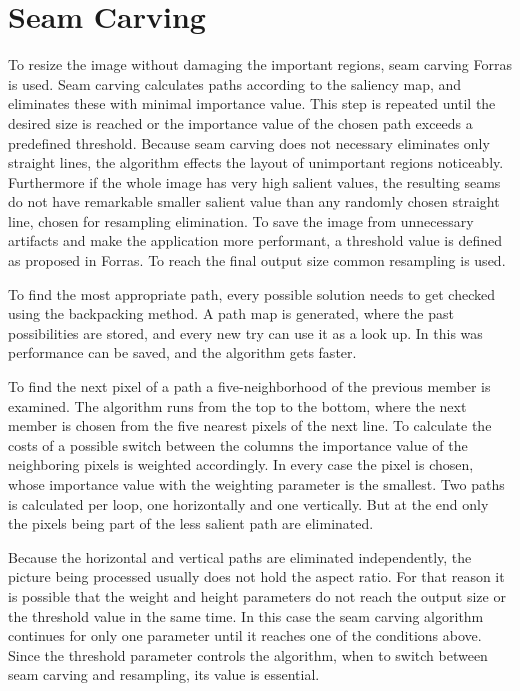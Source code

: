 \documentclass[draft,final]{vutinfth} %
\begin{document}
\section{Seam Carving}
To resize the image without damaging the important regions, seam carving Forras is used.
Seam carving calculates paths according to the saliency map, and eliminates these with minimal importance value.
This step is repeated until the desired size is reached or the importance value of the chosen path exceeds a predefined threshold.
Because seam carving does not necessary eliminates only straight lines, the algorithm effects the layout of unimportant regions noticeably.
Furthermore if the whole image has very high salient values, the resulting seams do not have remarkable smaller salient value than any randomly chosen straight line, chosen for resampling elimination.
To save the image from unnecessary artifacts and make the application more performant, a threshold value is defined as proposed in Forras.
To reach the final output size common resampling is used.\par 
To find the most appropriate path, every possible solution needs to get checked using the backpacking method.
A path map is generated, where the past possibilities are stored, and every new try can use it as a look up.
In this was performance can be saved, and the algorithm gets faster.\par 
To find the next pixel of a path a five-neighborhood of the previous member is examined.
The algorithm runs from the top to the bottom, where the next member is chosen from the five nearest pixels of the next line.
To calculate the costs of a possible switch between the columns the importance value of the neighboring pixels is weighted accordingly.
In every case the pixel is chosen, whose importance value with the weighting parameter is the smallest.
Two paths is calculated per loop, one horizontally and one vertically.
But at the end only the pixels being part of the less salient path are eliminated.\par 
Because the horizontal and vertical paths are eliminated independently, the picture being processed usually does not hold the aspect ratio.
For that reason it is possible that the weight and height parameters do not reach the output size or the threshold value in the same time.
In this case the seam carving algorithm continues for only one parameter until it reaches one of the conditions above. 
Since the threshold parameter controls the algorithm, when to switch between seam carving and resampling, its value is essential. 
\end{document}
